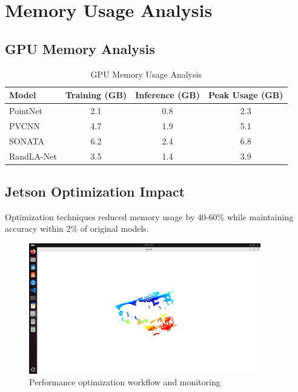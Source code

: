 \documentclass[12pt,a4paper]{report}
\begin{document}
\section{Memory Usage Analysis}

\subsection{GPU Memory Analysis}

\begin{table}[htbp]
\centering
\caption{GPU Memory Usage Analysis}
\label{tab:memory_analysis}
\begin{tabular}{@{}lccc@{}}
\toprule
\textbf{Model} & \textbf{Training (GB)} & \textbf{Inference (GB)} & \textbf{Peak Usage (GB)} \\
\midrule
PointNet & 2.1 & 0.8 & 2.3 \\
PVCNN & 4.7 & 1.9 & 5.1 \\
SONATA & 6.2 & 2.4 & 6.8 \\
RandLA-Net & 3.5 & 1.4 & 3.9 \\
\bottomrule
\end{tabular}
\end{table}

\subsection{Jetson Optimization Impact}

Optimization techniques reduced memory usage by 40-60\% while maintaining accuracy within 2\% of original models.

\begin{figure}[htbp]
    \centering
    \includegraphics[width=0.9\textwidth]{figures/performance_optimisation.png}
    \caption{Performance optimization workflow and monitoring}
    \label{fig:optimization_workflow}
\end{figure}
\end{document}
